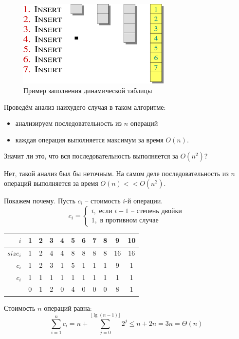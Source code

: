 \documentclass[a4paper,11pt]{article}
\begin{document}
\begin{figure}[ht]
  \centering
  \includegraphics[width=3in]{lecture13/insertion.eps}
  \caption{Пример заполнения динамической таблицы}
  \label{fig:insertion}
\end{figure}

Проведём анализ наихудего случая в таком алгоритме:

\begin{itemize}
\item анализируем последовательность из $n$ операций
\item каждая операция выполняется максимум за время $O(n)$.
\end{itemize}

Значит ли это, что вся последовательность выполняется за $O(n^2)$?

Нет, такой анализ был бы неточным. На самом деле последовательность из $n$
операций выполняется за время $O(n) << O(n^2)$.

Покажем почему. Пусть $c_i$ -- стоимость $i$-й операции.
$$
c_i = 
\begin{cases}
  i, \text{ если } i - 1 \text{ -- степень двойки}\\
  1, \text{ в противном случае}
\end{cases}
$$

\begin{center}
\begin{tabular}{|r|c|c|c|c|c|c|c|c|c|c|}
  \hline
     $i$ & 1 & 2 & 3 & 4 & 5 & 6 & 7 & 8 & 9  & 10 \\
  \hline
$size_i$ & 1 & 2 & 4 & 4 & 8 & 8 & 8 & 8 & 16 & 16 \\
  \hline
   $c_i$ & 1 & 2 & 3 & 1 & 5 & 1 & 1 & 1 & 9  & 1 \\
  \hline
   $c_i$ & 1 & 1 & 1 & 1 & 1 & 1 & 1 & 1 & 1 & 1 \\
         & 0 & 1 & 2 & 0 & 4 & 0 & 0 & 0 & 8 & 1 \\
  \hline
\end{tabular}
\end{center}

Стоимость $n$ операций равна:
$$
\sum_{i=1}^n c_i = n + \sum_{j=0}^{\lfloor \lg(n - 1) \rfloor} 2^j \leqslant n +
2n = 3n = \Theta(n)
$$
\end{document}
